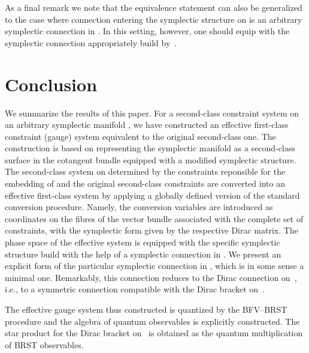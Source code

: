 \documentclass[a4paper,11pt]{amsart}
\numberwithin{thm}{section} %
\numberwithin{equation}{section} %
\numberwithin{figure}{section} %
\renewcommand{\:}{{\rm\, :\,}}
\def\bar{\overline}
\def\mod{{\mathcal T}^*_\omega}
\def\manM{{\mathcal M}}
\def\E{{ \mathcal E}}
\def\V{{\bf V}}
\def\W{{\bf W}}
\def\con{{\bar\Gamma}}
\begin{document}
As a final remark we note that the equivalence statement can also be
generalized to the case where connection \myHighlight{$\con$}\coordHE{} entering the
symplectic structure on \myHighlight{$\E$}\coordHE{} is an arbitrary symplectic connection in
\myHighlight{$\W(\manM)$}\coordHE{}. In this setting, however, one should equip \myHighlight{$T\V(\manM)$}\coordHE{}
with the symplectic connection appropriately build by~\myHighlight{$\con$}\coordHE{}.


\section{Conclusion}
We summarize the results of this paper.  For a second-class constraint
system on an arbitrary symplectic manifold \myHighlight{$\manM$}\coordHE{}, we have
constructed an effective first-class constraint (gauge) system
equivalent to the original second-class one. The construction is based
on representing the symplectic manifold as a second-class surface in
the cotangent bundle \myHighlight{$\mod\manM$}\coordHE{} equipped with a modified symplectic
structure.  The second-class system on \myHighlight{$\mod\manM$}\coordHE{} determined by the
constraints reponsible for the embedding of \myHighlight{$\manM$}\coordHE{} and the original
second-class constraints are converted into an effective first-class
system by applying a globally defined version of the standard
conversion procedure.  Namely, the conversion variables are introduced
as coordinates on the fibres of the vector bundle
\myHighlight{$\W(\manM)=T\manM\oplus \V(\manM)$}\coordHE{} associated with the complete set
of constraints, with the symplectic form given by the respective Dirac
matrix.  The phase space of the effective system is equipped with the
specific symplectic structure build with the help of a symplectic
connection in \myHighlight{$\W(\manM)$}\coordHE{}.  We present an explicit form of the
particular symplectic connection in \myHighlight{$\W(\manM)$}\coordHE{}, which is in some
sense a minimal one.  Remarkably, this connection reduces to the Dirac
connection on~\myHighlight{$\manM$}\coordHE{}, i.e., to a symmetric connection compatible with
the Dirac bracket on~\myHighlight{$\manM$}\coordHE{}.

The effective gauge system thus constructed is quantized by the
BFV--BRST procedure and the algebra of quantum observables is
explicitly constructed.  The star product for the Dirac bracket
on~\myHighlight{$\manM$}\coordHE{} is obtained as the quantum multiplication of  BRST
observables.
\end{document}

